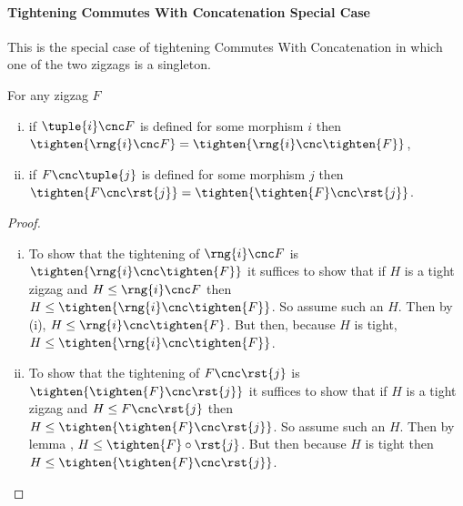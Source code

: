 \paragraph*{Tightening Commutes With Concatenation Special Case}
This is the special case of tightening Commutes With Concatenation in which one of the two zigzags is a singleton.
\begin{lemma}
For any zigzag $F$
\begin{enumerate}[(i)]
\item
if $\tuple{i} \cnc F$ is defined for some morphism $i$ then
$\tighten{\rng{i} \cnc F}
         = \tighten{\rng{i} \cnc \tighten{F}}$,
\item 
if $F \cnc \tuple{j}$ is defined for some morphism $j$ then
$\tighten{F \cnc \rst{j}}
         = \tighten{\tighten{F} \cnc \rst{j}}$.
\end{enumerate}
\end{lemma}
\begin{proof}
~
\begin{enumerate}[(i)]
\item %
To show that the tightening of $\rng{i} \cnc F$
is $\tighten{\rng{i}\cnc \tighten{F}}$ it suffices to show that if
$H$ is a tight zigzag and $H \leq \rng{i} \cnc F$ then
$H \leq \tighten{\rng{i}\cnc \tighten{F}}$. So assume such an $H$.
Then by  (i), $H \leq \rng{i} \cnc \tighten{F}$.
But then, because $H$ is tight,
$H \leq \tighten{\rng{i}\cnc \tighten{F}}$.
\item %
To show that the tightening of $F \cnc \rst{j}$ 
is $\tighten{\tighten{F}\cnc \rst{j}}$ it suffices to show that if
$H$ is a tight zigzag and $H \leq F \cnc \rst{j}$ then
$H \leq  \tighten{\tighten{F}\cnc \rst{j}}$. So assume such an $H$.
Then by lemma , $H \leq \tighten{F} \circ \rst{j}$. But then because $H$ is tight then $H \leq \tighten{\tighten{F} \cnc\rst{j}}$. 
\end{enumerate}
\end{proof}

